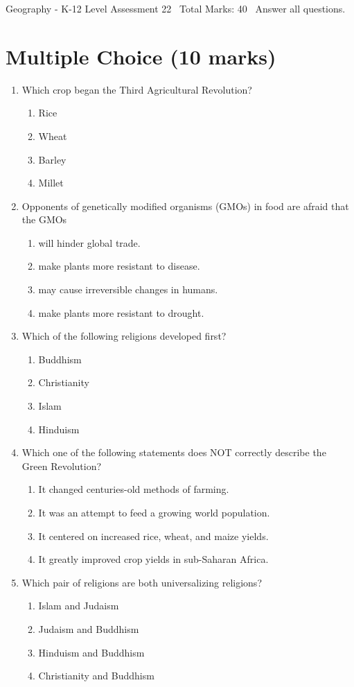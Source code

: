 \documentclass[12pt]{article}
\begin{document}
\begin{center}
Geography - K-12 Level Assessment 22 \
Total Marks: 40 \
Answer all questions.
\end{center}

\section*{Multiple Choice (10 marks)}
\begin{enumerate}[label=\arabic*.]
\item Which crop began the Third Agricultural Revolution?
\begin{enumerate}[label=(\alph*)]
    \item Rice
    \item Wheat
    \item Barley
    \item Millet
\end{enumerate}
\item Opponents of genetically modified organisms (GMOs) in food are afraid that the GMOs
\begin{enumerate}[label=(\alph*)]
    \item will hinder global trade.
    \item make plants more resistant to disease.
    \item may cause irreversible changes in humans.
    \item make plants more resistant to drought.
\end{enumerate}
\item Which of the following religions developed first?
\begin{enumerate}[label=(\alph*)]
    \item Buddhism
    \item Christianity
    \item Islam
    \item Hinduism
\end{enumerate}
\item Which one of the following statements does NOT correctly describe the Green Revolution?
\begin{enumerate}[label=(\alph*)]
    \item It changed centuries-old methods of farming.
    \item It was an attempt to feed a growing world population.
    \item It centered on increased rice, wheat, and maize yields.
    \item It greatly improved crop yields in sub-Saharan Africa.
\end{enumerate}
\item Which pair of religions are both universalizing religions?
\begin{enumerate}[label=(\alph*)]
    \item Islam and Judaism
    \item Judaism and Buddhism
    \item Hinduism and Buddhism
    \item Christianity and Buddhism
\end{enumerate}
\end{enumerate}
\end{document}
